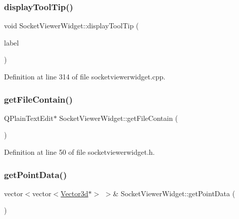 \subsubsection{\texorpdfstring{displayToolTip()}{displayToolTip()}}
{\footnotesize\ttfamily void Socket\+Viewer\+Widget\+::display\+Tool\+Tip (\begin{DoxyParamCaption}\item[{\mbox{\hyperlink{class_coordinates_label}{Coordinates\+Label}} $\ast$}]{label }\end{DoxyParamCaption})}



Definition at line 314 of file socketviewerwidget.\+cpp.

\mbox{\label{class_socket_viewer_widget_a24597c9eddcbdbb42a102520c79c005c}} 
\subsubsection{\texorpdfstring{getFileContain()}{getFileContain()}}
{\footnotesize\ttfamily Q\+Plain\+Text\+Edit$\ast$ Socket\+Viewer\+Widget\+::get\+File\+Contain (\begin{DoxyParamCaption}{ }\end{DoxyParamCaption})\hspace{0.3cm}{\ttfamily [inline]}}



Definition at line 50 of file socketviewerwidget.\+h.

\mbox{\label{class_socket_viewer_widget_aa309d85a95b34b9bf8986bad5ea578f2}} 
\subsubsection{\texorpdfstring{getPointData()}{getPointData()}}
{\footnotesize\ttfamily vector$<$vector$<$\mbox{\hyperlink{struct_vector3d}{Vector3d}}$\ast$$>$ $>$\& Socket\+Viewer\+Widget\+::get\+Point\+Data (\begin{DoxyParamCaption}{ }\end{DoxyParamCaption})\hspace{0.3cm}{\ttfamily [inline]}}



